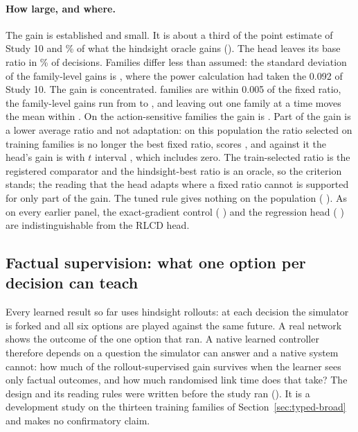 \documentclass[10pt]{article}
\begin{document}
\paragraph{How large, and where.}
The gain is established and small. It is about a third of the \TypedBroadTestOodBayesVsTrain{} point estimate of Study 10 and \TypedRepOracleShare\% of what the hindsight oracle gains (\TypedRepOracleGain{}). The head leaves its base ratio in \TypedRepOverride\% of decisions. Families differ less than assumed: the standard deviation of the family-level gains is \TypedRepFamilySd{}, where the power calculation had taken the 0.092 of Study 10. The gain is concentrated. \TypedRepNearZero{} families are within 0.005 of the fixed ratio, the family-level gains run from \TypedRepSmallest{} to \TypedRepLargest{}, and leaving out one family at a time moves the mean within \TypedRepGainLeaveOut{}. On the \TypedRepSensitiveFamilies{} action-sensitive families the gain is \TypedRepSensitiveGain{} \TypedRepSensitiveGainT{}. Part of the gain is a lower average ratio and not adaptation: on this population the ratio selected on training families is no longer the best fixed ratio, \TypedRepHindsightRatio{} scores \TypedRepHindsightUtility{}, and against it the head's gain is \TypedRepGainVsHindsight{} with $t$ interval \TypedRepGainVsHindsightT{}, which includes zero. The train-selected ratio is the registered comparator and the hindsight-best ratio is an oracle, so the criterion stands; the reading that the head adapts where a fixed ratio cannot is supported for only part of the gain. The tuned rule gives nothing on the population (\TypedRepRuleVsFixed{} \TypedRepRuleVsFixedT{}). As on every earlier panel, the exact-gradient control (\TypedRepRlcdVsAnalytic{} \TypedRepRlcdVsAnalyticT{}) and the regression head (\TypedRepRlcdVsRegress{} \TypedRepRlcdVsRegressT{}) are indistinguishable from the RLCD head.

\subsection{Factual supervision: what one option per decision can teach}
\label{sec:typed-factual}
Every learned result so far uses hindsight rollouts: at each decision the simulator is forked and all six options are played against the same future. A real network shows the outcome of the one option that ran. A native learned controller therefore depends on a question the simulator can answer and a native system cannot: how much of the rollout-supervised gain survives when the learner sees only factual outcomes, and how much randomised link time does that take? The design and its reading rules were written before the study ran (). It is a development study on the thirteen training families of Section~\ref{sec:typed-broad} and makes no confirmatory claim.
\end{document}
